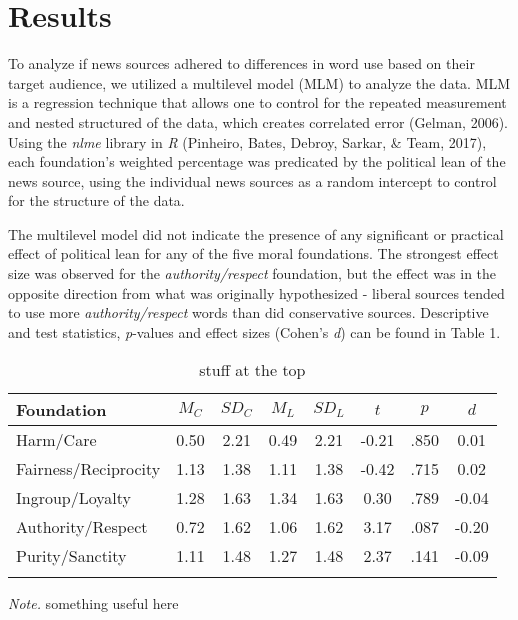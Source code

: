 \documentclass[,man]{apa6}
\begin{document}
\hypertarget{results}{%
\section{Results}\label{results}}

To analyze if news sources adhered to differences in word use based on their target audience, we utilized a multilevel model (MLM) to analyze the data. MLM is a regression technique that allows one to control for the repeated measurement and nested structured of the data, which creates correlated error (Gelman, 2006). Using the \emph{nlme} library in \emph{R} (Pinheiro, Bates, Debroy, Sarkar, \& Team, 2017), each foundation's weighted percentage was predicated by the political lean of the news source, using the individual news sources as a random intercept to control for the structure of the data.

The multilevel model did not indicate the presence of any significant or practical effect of political lean for any of the five moral foundations. The strongest effect size was observed for the \emph{authority/respect} foundation, but the effect was in the opposite direction from what was originally hypothesized - liberal sources tended to use more \emph{authority/respect} words than did conservative sources. Descriptive and test statistics, \emph{p}-values and effect sizes (Cohen's \emph{d}) can be found in Table 1.

\begin{table}[tbp]
\begin{center}
\begin{threeparttable}
\caption{\label{tab:exp1-table}stuff at the top}
\begin{tabular}{lccccccc}
\toprule
Foundation & $M_C$ & $SD_C$ & $M_L$ & $SD_L$ & $t$ & $p$ & $d$\\
\midrule
Harm/Care & 0.50 & 2.21 & 0.49 & 2.21 & -0.21 & .850 & 0.01\\
Fairness/Reciprocity & 1.13 & 1.38 & 1.11 & 1.38 & -0.42 & .715 & 0.02\\
Ingroup/Loyalty & 1.28 & 1.63 & 1.34 & 1.63 & 0.30 & .789 & -0.04\\
Authority/Respect & 0.72 & 1.62 & 1.06 & 1.62 & 3.17 & .087 & -0.20\\
Purity/Sanctity & 1.11 & 1.48 & 1.27 & 1.48 & 2.37 & .141 & -0.09\\
\bottomrule
\addlinespace
\end{tabular}
\begin{tablenotes}[para]
\normalsize{\textit{Note.} something useful here}
\end{tablenotes}
\end{threeparttable}
\end{center}
\end{table}
\end{document}

